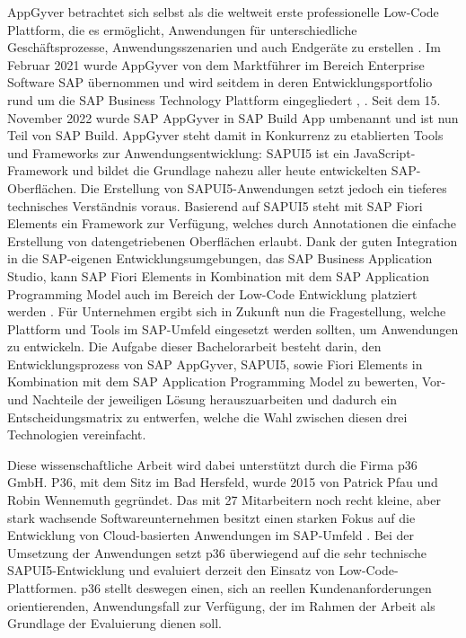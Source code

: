 AppGyver betrachtet sich selbst als die weltweit erste professionelle Low-Code Plattform, die es ermöglicht, Anwendungen für unterschiedliche Geschäftsprozesse, Anwendungsszenarien und auch Endgeräte zu erstellen \cite{lcnc:appgyv}. Im Februar 2021 wurde AppGyver von dem Marktführer im Bereich Enterprise Software SAP übernommen und wird seitdem in deren Entwicklungsportfolio rund um die SAP Business Technology Plattform eingegliedert \cite{lcnc:ncp}, \cite{lcnc:appgyvint}. Seit dem 15. November 2022 wurde SAP AppGyver in SAP Build App umbenannt und ist nun Teil von SAP Build. AppGyver steht damit in Konkurrenz zu etablierten Tools und Frameworks zur Anwendungsentwicklung: SAPUI5 ist ein JavaScript-Framework und bildet die Grundlage nahezu aller heute entwickelten SAP-Oberflächen. Die Erstellung von SAPUI5-Anwendungen setzt jedoch ein tieferes technisches Verständnis voraus. Basierend auf SAPUI5 steht mit SAP Fiori Elements ein Framework zur Verfügung, welches durch Annotationen die einfache Erstellung von datengetriebenen Oberflächen erlaubt. Dank der guten Integration in die SAP-eigenen Entwicklungsumgebungen, das SAP Business Application Studio, kann SAP Fiori Elements in Kombination mit dem SAP Application Programming Model auch im Bereich der Low-Code Entwicklung platziert werden \cite{lcnc:fiori}. Für Unternehmen ergibt sich in Zukunft nun die Fragestellung, welche Plattform und Tools im SAP-Umfeld eingesetzt werden sollten, um Anwendungen zu entwickeln. Die Aufgabe dieser Bachelorarbeit besteht darin, den Entwicklungsprozess von SAP AppGyver, SAPUI5, sowie Fiori Elements in Kombination mit dem SAP Application Programming Model zu bewerten, Vor- und Nachteile der jeweiligen Lösung herauszuarbeiten und dadurch ein Entscheidungsmatrix zu entwerfen, welche die Wahl zwischen diesen drei Technologien vereinfacht.

Diese wissenschaftliche Arbeit wird dabei unterstützt durch die Firma p36 GmbH. P36, mit dem Sitz im Bad Hersfeld, wurde 2015 von Patrick Pfau und Robin Wennemuth gegründet. Das mit 27 Mitarbeitern noch recht kleine, aber stark wachsende Softwareunternehmen besitzt einen starken Fokus auf die Entwicklung von Cloud-basierten Anwendungen im SAP-Umfeld \cite{lcnc:p36}.  Bei der Umsetzung der Anwendungen setzt p36 überwiegend auf die sehr technische SAPUI5-Entwicklung und evaluiert derzeit den Einsatz von Low-Code-Plattformen. p36 stellt deswegen einen, sich an reellen Kundenanforderungen orientierenden, Anwendungsfall zur Verfügung, der im Rahmen der Arbeit als Grundlage der Evaluierung dienen soll. 

